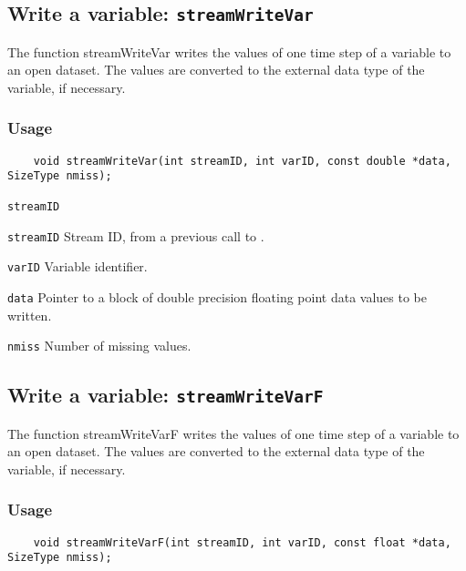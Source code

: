 

\subsection{Write a variable: \texttt{streamWriteVar}}
\label{streamWriteVar}

The function streamWriteVar writes the values of one time step of a variable to an open dataset.
The values are converted to the external data type of the variable, if necessary.
\subsubsection*{Usage}

\begin{verbatim}
    void streamWriteVar(int streamID, int varID, const double *data, SizeType nmiss);
\end{verbatim}

\hspace*{4mm}\begin{minipage}[]{15cm}
\begin{deflist}{\texttt{streamID}\ }
\item[\texttt{streamID}]
Stream ID, from a previous call to {}.
\item[\texttt{varID}]
Variable identifier.
\item[\texttt{data}]
Pointer to a block of double precision floating point data values to be written.
\item[\texttt{nmiss}]
Number of missing values.

\end{deflist}
\end{minipage}


\subsection{Write a variable: \texttt{streamWriteVarF}}
\label{streamWriteVarF}

The function streamWriteVarF writes the values of one time step of a variable to an open dataset.
The values are converted to the external data type of the variable, if necessary.
\subsubsection*{Usage}

\begin{verbatim}
    void streamWriteVarF(int streamID, int varID, const float *data, SizeType nmiss);
\end{verbatim}

